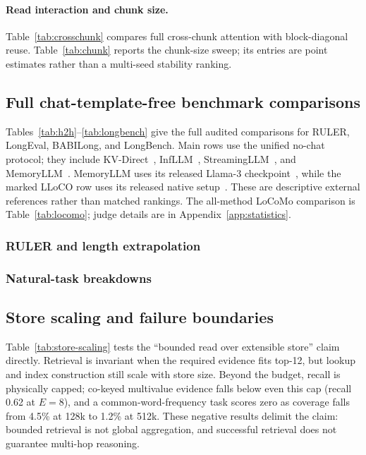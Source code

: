 \paragraph{Read interaction and chunk size.}
Table~\ref{tab:crosschunk} compares full cross-chunk attention with
block-diagonal reuse. Table~\ref{tab:chunk} reports the chunk-size sweep; its
entries are point estimates rather than a multi-seed stability ranking.


\subsection{Full chat-template-free benchmark comparisons}
\label{app:tasks}
Tables~\ref{tab:h2h}--\ref{tab:longbench} give the full audited comparisons for
RULER, LongEval, BABILong, and LongBench. Main rows use the unified no-chat
protocol; they include KV-Direct~\citep{kvdirect}, InfLLM~\citep{infllm},
StreamingLLM~\citep{streamingllm}, and MemoryLLM~\citep{memoryllm}. MemoryLLM
uses its released Llama-3 checkpoint~\citep{llama3}, while the marked LLoCO
row uses its released native setup~\citep{lloco}. These are descriptive external
references rather than matched rankings.
The all-method LoCoMo comparison is Table~\ref{tab:locomo}; judge details are in
Appendix~\ref{app:statistics}.


\FloatBarrier
\subsubsection{RULER and length extrapolation}


\FloatBarrier
\subsubsection{Natural-task breakdowns}





\FloatBarrier
\subsection{Store scaling and failure boundaries}
\label{app:scaling}
Table~\ref{tab:store-scaling} tests the ``bounded read over extensible store''
claim directly. Retrieval is invariant when the required evidence fits top-12,
but lookup and index construction still scale with store size. Beyond the budget,
recall is physically capped; co-keyed multivalue evidence falls below even this
cap (recall 0.62 at $E{=}8$), and a common-word-frequency task scores zero as
coverage falls from 4.5\% at 128k to 1.2\% at 512k. These negative results delimit
the claim: bounded retrieval is not global aggregation, and successful retrieval
does not guarantee multi-hop reasoning.

